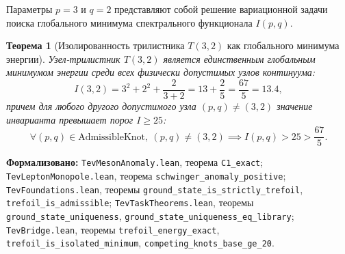\documentclass[11pt,a4paper]{article}
\newtheorem{theorem}{Теорема}
\theoremstyle{definition}
\theoremstyle{remark}
\begin{document}
Параметры $p=3$ и $q=2$ представляют собой решение вариационной задачи поиска глобального минимума спектрального функционала $I(p,q)$.
	
\begin{theorem}[Изолированность трилистника $T(3,2)$ как глобального минимума энергии]
\label{thm:trefoil_uniqueness}
Узел-трилистник $T(3,2)$ является единственным глобальным минимумом энергии среди всех физически допустимых узлов континуума:
\begin{equation}
	I(3, 2) = 3^2 + 2^2 + \frac{2}{3 + 2} = 13 + \frac{2}{5} = \frac{67}{5} = 13.4,
	\label{eq:trefoil_energy_exact}
\end{equation}
причем для любого другого допустимого узла $(p, q) \ne (3, 2)$ значение инварианта превышает порог $I \ge 25$:
\begin{equation}
	\forall (p, q) \in \mathrm{AdmissibleKnot}, \ (p, q) \ne (3, 2) \implies I(p, q) > 25 > \frac{67}{5}.
	\label{eq:trefoil_competitor_bound}
\end{equation}
\end{theorem}

\noindent\small\textbf{Формализовано:} \texttt{TevMesonAnomaly.lean}, теорема \texttt{C1_exact}; \texttt{TevLeptonMonopole.lean}, теорема \texttt{schwinger_anomaly_positive};
\texttt{TevFoundations.lean}, теоремы \texttt{ground_state_is_strictly_trefoil}, \texttt{trefoil\_is\_admissible}; \texttt{TevTaskTheorems.lean}, теоремы \texttt{ground\_state\_uniqueness}, \texttt{ground\_state\_uniqueness\_eq\_library}; \texttt{TevBridge.lean}, теоремы \texttt{trefoil_energy_exact}, \texttt{trefoil_is_isolated_minimum}, \texttt{competing_knots_base_ge_20}.
\end{document}
